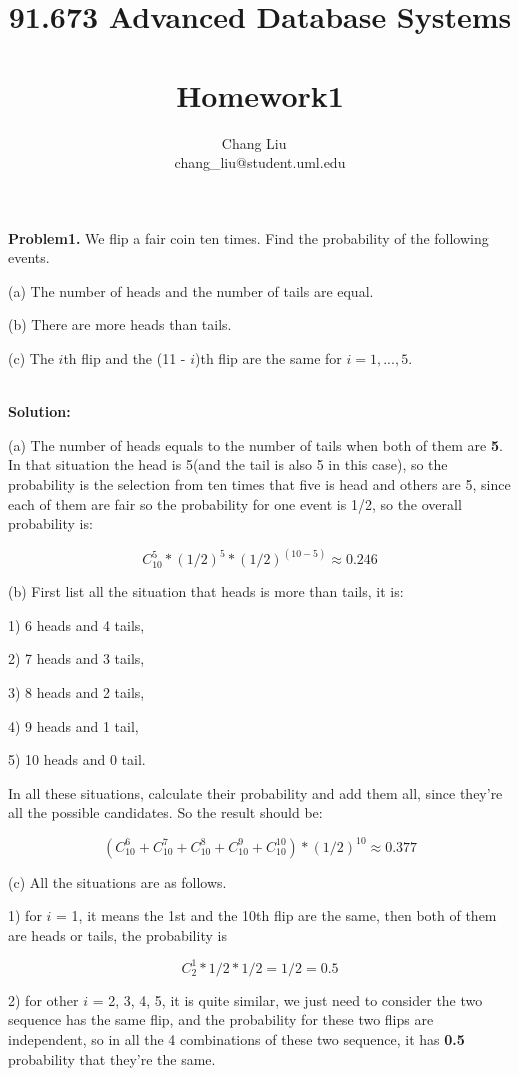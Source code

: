 \documentclass{article}
\author{Chang Liu ~\\ chang\_liu@student.uml.edu}
\title{91.673 Advanced Database Systems ~\\ Homework1}
\begin{document}
\maketitle



\noindent \textbf{Problem1.} We flip a fair coin ten times. Find the probability of the following events.

(a) The number of heads and the number of tails are equal.

(b) There are more heads than tails.

(c) The $i$th flip and the (11 - $i$)th flip are the same for $i = 1, . . . , 5$.

~\\

\noindent \textbf{Solution:}

(a) The number of heads equals to the number of tails when both of them are \textbf{5}. In that situation the head is 5(and the tail is also 5 in this case), so the probability is the selection from ten times that five is head and others are 5, since each of them are fair so the probability for one event is 1/2, so the overall probability is:

$$C_{10}^5 * (1/2)^5 * (1/2)^{(10-5)} \approx 0.246$$

(b) First list all the situation that heads is more than tails, it is:

1) 6 heads and 4 tails,

2) 7 heads and 3 tails,

3) 8 heads and 2 tails,

4) 9 heads and 1 tail,

5) 10 heads and 0 tail.

In all these situations, calculate their probability and add them all, since they're all the possible candidates. So the result should be:

$$ (C_{10}^6 + C_{10}^7 + C_{10}^8 + C_{10}^9 + C_{10}^10) * (1/2)^{10} \approx 0.377$$


(c) All the situations are as follows.

1) for $i$ = 1, it means the 1st and the 10th flip are the same, then both of them are heads or tails, the probability is

$$ C_2^1 * 1/2 * 1/2 = 1/2 = 0.5$$

2) for other $i$ = 2, 3, 4, 5, it is quite similar, we just need to consider the two sequence has the same flip, and the probability for these two flips are independent, so in all the 4 combinations of these two sequence, it has \textbf{0.5} probability that they're the same.
\end{document}
